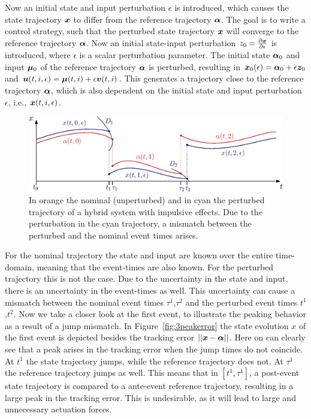 \documentclass[../DC2017114Bouma.tex]{subfiles}
\begin{document}
Now an initial state and input perturbation $\epsilon$ is introduced, which causes the state trajectory ${\boldsymbol{x}}$ to differ from the reference trajectory $\boldsymbol{\alpha}$. The goal is to write a control strategy, such that the perturbed state trajectory ${\boldsymbol{x}}$ will converge to the reference trajectory $\boldsymbol{\alpha}$. Now an initial state-input perturbation $z_0 = \frac{\partial{\boldsymbol{x}}}{\partial\epsilon}$ is introduced, where $\epsilon$ is a scalar perturbation parameter. The initial state $\boldsymbol{\alpha}_0$ and input $\boldsymbol{\mu}_0$ of the reference trajectory $\boldsymbol{\alpha}$ is perturbed, resulting in ${\boldsymbol{x}}_0(\epsilon) = \boldsymbol{\alpha}_0 + \epsilon{\boldsymbol{z}}_0$ and ${\boldsymbol{u}}(t,i,\epsilon) = \boldsymbol{\mu}(t,i) + \epsilon{\boldsymbol{v}}(t,i)$. This generates a trajectory close to the reference trajectory $\boldsymbol{\alpha}$, which is also dependent on the initial state and input perturbation $\epsilon$, i.e., ${\boldsymbol{x}}(t,i,\epsilon)$.
%
%
\begin{figure}[h]
\centering
\includegraphics[width=.8\textwidth]{perturbedtraj.eps}\caption{In orange the nominal (unperturbed) and in cyan the perturbed trajectory of a hybrid system with impulsive effects. Due to the perturbation in the cyan trajectory, a mismatch between the perturbed and the nominal event times arises.} \label{fig:3perturbedtraj}
\end{figure}
For the nominal trajectory the state and input are known over the entire time-domain, meaning that the event-times are also known. For the perturbed trajectory this is not the case. Due to the uncertainty in the state and input, there is an uncertainty in the event-times as well. This uncertainty can cause a mismatch between the nominal event times $\tau^1$,$\tau^2$ and the perturbed event times $t^1$,$t^2$. Now we take a closer look at the first event, to illustrate the peaking behavior as a result of a jump mismatch. In Figure~\ref{fig:3peakerror} the state evolution $x$ of the first event is depicted besides the tracking error $||{\boldsymbol{x}}-\boldsymbol{\alpha}||$. Here on can clearly see that a peak arises in the tracking error when the jump times do not coincide. At $t^1$ the state trajectory jumps, while the reference trajectory does not. At $\tau^1$ the reference trajectory jumps as well. This means that in $[t^1,\tau^1]$, a post-event state trajectory is compared to a ante-event reference trajectory, resulting in a large peak in the tracking error. This is undesirable, as it will lead to large and unnecessary actuation forces.
\end{document}
